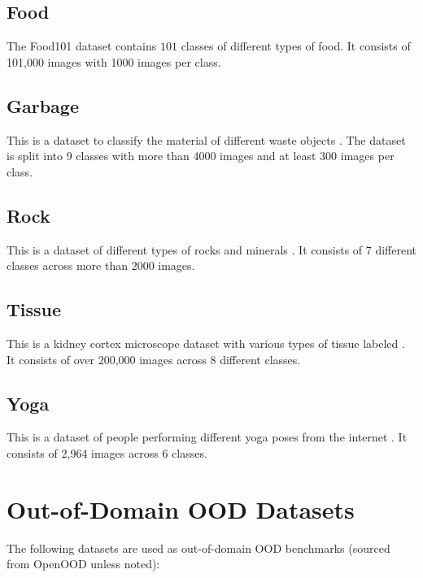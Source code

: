 \documentclass[10pt,twocolumn,letterpaper]{article}
\begin{document}
\subsection{Food} The Food101 dataset \citep{food} contains $101$ classes of different types of food. It consists of 101,000 images with 1000 images per class.

\subsection{Garbage} This is a dataset to classify the material of different waste objects \citep{single2023realwaste}. The dataset is split into 9 classes with more than 4000 images and at least 300 images per class.

\subsection{Rock} This is a dataset of different types of rocks and minerals \citep{rock_data}. It consists of 7 different classes across more than 2000 images.

\subsection{Tissue} This is a kidney cortex microscope dataset with various types of tissue labeled \citep{yang2023medmnist}. It consists of over 200,000 images across 8 different classes.

\subsection{Yoga} This is a dataset of people performing different yoga poses from the internet \citep{yoga_data}. It consists of 2,964 images across 6 classes.


\section{Out-of-Domain OOD Datasets}
\label{sec:ood_datasets}

The following datasets are used as out-of-domain OOD benchmarks (sourced from OpenOOD \citep{zhang2023openood} unless noted):
\end{document}
